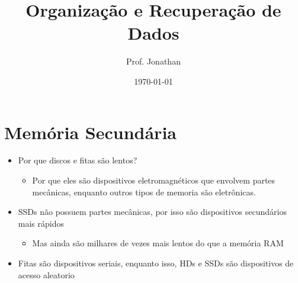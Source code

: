 \documentclass[12pt]{article}
\title{Organização e Recuperação de Dados}
\author{Prof. Jonathan}
\date{\today}
\begin{document}
\maketitle

\tableofcontents
\break

\section{Memória Secundária}
\begin{itemize}
    \item Por que discos e fitas são lentos?
    \begin{itemize}
        \item Por que eles são dispositivos eletromagnéticos que envolvem 
        partes mecânicas, enquanto outros tipos de memoria são eletrônicas.
    \end{itemize}
    \item SSDs não possuem partes mecânicas, por isso são dispositivos 
    secundários mais rápidos
    \begin{itemize}
        \item Mas ainda são milhares de vezes mais lentos do que a memória RAM
    \end{itemize}
    \item Fitas são dispositivos seriais, enquanto isso, HDs e SSDs são 
    dispositivos de acesso aleatorio
\end{itemize}
\end{document}

